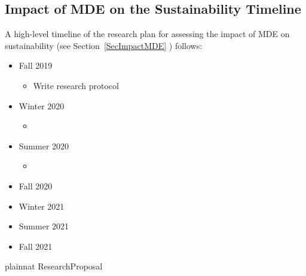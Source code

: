 \documentclass[12pt]{article}
\begin{document}
\subsection{Impact of MDE on the Sustainability Timeline}

A high-level timeline of the research plan for assessing the impact of MDE on
sustainability (see Section~\ref{SecImpactMDE} ) follows:

\begin{itemize}
\item Fall 2019
  \begin{itemize}
  \item Write research protocol
  \end{itemize}
\item Winter 2020
  \begin{itemize}
  \item 
  \end{itemize}
\item Summer 2020
  \begin{itemize}
  \item 
  \end{itemize}
\item Fall 2020
\item Winter 2021
\item Summer 2021
\item Fall 2021
\end{itemize}

\newpage

 {plainnat}
 {ResearchProposal}
\end{document}
